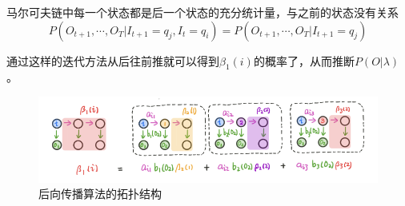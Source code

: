 马尔可夫链中每一个状态都是后一个状态的充分统计量，与之前的状态没有关系
\begin{equation}
    P(O_{t+1},\cdots,O_T|I_{t+1}=q_j,I_t=q_i)=P(O_{t+1},\cdots,O_T|I_{t+1}=q_j)
\end{equation}

通过这样的迭代方法从后往前推就可以得到$\beta_1(i)$的概率了，从而推断$P(O|\lambda)$。

\begin{figure}[H]
    \centering
    \includegraphics[scale=0.5]{figures/后向算法示意图.png}
    \caption{后向传播算法的拓扑结构}
\end{figure}